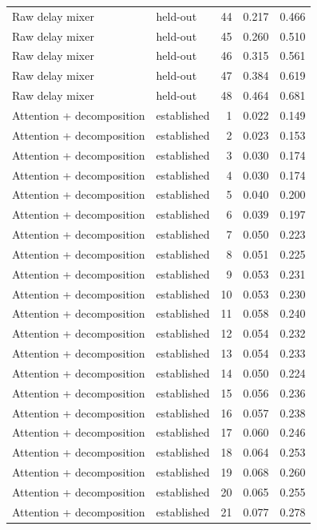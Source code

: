 \begin{tabular}{llrrr}
Raw delay mixer & held-out & 44 & 0.217 & 0.466 \\
Raw delay mixer & held-out & 45 & 0.260 & 0.510 \\
Raw delay mixer & held-out & 46 & 0.315 & 0.561 \\
Raw delay mixer & held-out & 47 & 0.384 & 0.619 \\
Raw delay mixer & held-out & 48 & 0.464 & 0.681 \\
Attention + decomposition & established & 1 & 0.022 & 0.149 \\
Attention + decomposition & established & 2 & 0.023 & 0.153 \\
Attention + decomposition & established & 3 & 0.030 & 0.174 \\
Attention + decomposition & established & 4 & 0.030 & 0.174 \\
Attention + decomposition & established & 5 & 0.040 & 0.200 \\
Attention + decomposition & established & 6 & 0.039 & 0.197 \\
Attention + decomposition & established & 7 & 0.050 & 0.223 \\
Attention + decomposition & established & 8 & 0.051 & 0.225 \\
Attention + decomposition & established & 9 & 0.053 & 0.231 \\
Attention + decomposition & established & 10 & 0.053 & 0.230 \\
Attention + decomposition & established & 11 & 0.058 & 0.240 \\
Attention + decomposition & established & 12 & 0.054 & 0.232 \\
Attention + decomposition & established & 13 & 0.054 & 0.233 \\
Attention + decomposition & established & 14 & 0.050 & 0.224 \\
Attention + decomposition & established & 15 & 0.056 & 0.236 \\
Attention + decomposition & established & 16 & 0.057 & 0.238 \\
Attention + decomposition & established & 17 & 0.060 & 0.246 \\
Attention + decomposition & established & 18 & 0.064 & 0.253 \\
Attention + decomposition & established & 19 & 0.068 & 0.260 \\
Attention + decomposition & established & 20 & 0.065 & 0.255 \\
Attention + decomposition & established & 21 & 0.077 & 0.278 \\

\end{tabular}
